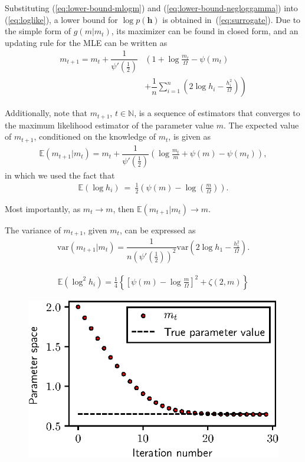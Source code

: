 \documentclass[conference, 10pt]{IEEEtran}
\begin{document}
Substituting (\ref{eq:lower-bound-mlogm}) and (\ref{eq:lower-bound-negloggamma}) into
(\ref{eq:loglike}), a lower bound for $\log p(\bm{h})$ is obtained in~(\ref{eq:surrogate}).
Due to the simple form of $g(m | m_t)$, its maximizer can be found in closed form, and
an updating rule for the MLE can be written as
\begin{align}
    m_{t+1} = m_t + \dfrac{1}{\psi'(\frac{1}{2})}&\left(1 + \log \frac{m_t}{\Omega} - \psi(m_t) \right.\nonumber\\
    &\left.+ \dfrac{1}{n} \sum_{i=1}^{n}\left(2\log h_i - \frac{h_i^2}{\Omega}\right)\right)
\end{align}

Additionally,
note that $m_{t+1}$, $t \in \mathbb{N}$, is a sequence of estimators that converges to the maximum
likelihood estimator of the parameter value $m$.
The expected value of $m_{t+1}$, conditioned on the knowledge of $m_t$, is given as
\begin{align}
    \mathbb{E}(m_{t+1} | m_t) = m_t + \dfrac{1}{\psi'(\frac{1}{2})}\left(\log \frac{m_t}{m} + \psi(m) - \psi(m_t)\right),
\end{align}
in which we used the fact that~\cite{gradshteyn2007}
\begin{align}
    \mathbb{E}\left(\log h_i\right)~=~\frac{1}{2}\left(\psi(m)-\log\left(\frac{m}{\Omega}\right)\right).
\end{align}

Most importantly, as $m_t \rightarrow m$, then $\mathbb{E}(m_{t+1} | m_t) \rightarrow m$.

The variance of $m_{t+1}$, given $m_t$, can be expressed as
\begin{align}
    \mathrm{var}(m_{t+1} | m_t) = \dfrac{1}{n\left(\psi'(\frac{1}{2})\right)^2}
    \mathrm{var}\left(2\log h_1 - \frac{h_1^2}{\Omega}\right).
\end{align}

\begin{align}
    \mathbb{E}\left(\log ^ 2 h_i\right) = \frac{1}{4}\left\{\left[\psi(m) - \log\frac{m}{\Omega}\right]^2 + \zeta(2, m)\right\}
\end{align}

\begin{figure}
    \centering
    \includegraphics{figures/mm.eps}
\end{figure}
\end{document}
